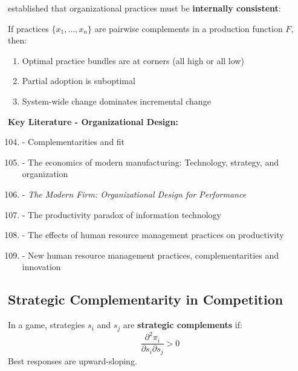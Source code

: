\citet{milgrom1995} established that organizational practices must be \textbf{internally consistent}:

\begin{theorem}
If practices $\{x_1, \ldots, x_n\}$ are pairwise complements in a production function $F$, then:
\begin{enumerate}
    \item Optimal practice bundles are at corners (all high or all low)
    \item Partial adoption is suboptimal
    \item System-wide change dominates incremental change
\end{enumerate}
\end{theorem}

\textbf{Key Literature - Organizational Design:}
\begin{enumerate}[noitemsep]
    \setcounter{enumi}{103}
    \item \citet{milgrom1995} - Complementarities and fit
    \item \citet{milgrom1990b} - The economics of modern manufacturing: Technology, strategy, and organization
    \item \citet{roberts2004} - \textit{The Modern Firm: Organizational Design for Performance}
    \item \citet{brynjolfsson1997} - The productivity paradox of information technology
    \item \citet{ichniowski1997} - The effects of human resource management practices on productivity
    \item \citet{laursen2003} - New human resource management practices, complementarities and innovation
\end{enumerate}

\subsection{Strategic Complementarity in Competition}
\label{subsec:strategic-competition}

\begin{definition}
In a game, strategies $s_i$ and $s_j$ are \textbf{strategic complements} if:
\begin{equation}
\frac{\partial^2 \pi_i}{\partial s_i \partial s_j} > 0
\end{equation}
Best responses are upward-sloping.
\end{definition}

